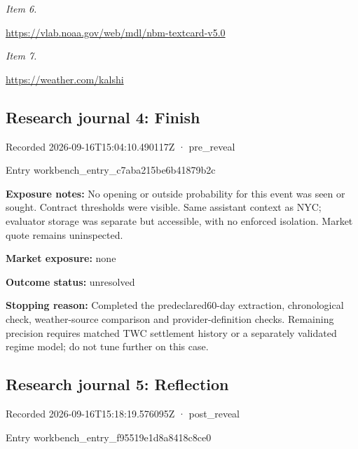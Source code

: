 \documentclass[11pt]{article}
\begin{document}
\par\noindent\textit{Item 6.}\par \href{https://vlab.noaa.gov/web/mdl/nbm-textcard-v5.0}{https://vlab\hspace{0pt}.noaa.gov/we\hspace{0pt}b/mdl/nbm-te\hspace{0pt}xtcard-v5.0}

\par\noindent\textit{Item 7.}\par \href{https://weather.com/kalshi}{https://weather.com/kalshi}

\subsection*{\textcolor{epdarkgreen}{Research journal 4: Finish}}
Recorded 2026-09-16T15:04:10.490117Z · pre\_reveal


Entry workbench\_en\hspace{0pt}try\_c7aba215\hspace{0pt}be6b41879b2c


\par\noindent\textbf{Exposure notes:} No opening or outside probability for this event was seen or sought. Contract thresholds were visible. Same assistant context as NYC; evaluator storage was separate but accessible, with no enforced isolation. Market quote remains uninspected.

\par\noindent\textbf{Market exposure:} none

\par\noindent\textbf{Outcome status:} unresolved

\par\noindent\textbf{Stopping reason:} Completed the predeclared60-day extraction, chronological check, weather-source comparison and provider-definition checks. Remaining precision requires matched TWC settlement history or a separately validated regime model; do not tune further on this case.

\subsection*{\textcolor{epdarkgreen}{Research journal 5: Reflection}}
Recorded 2026-09-16T15:18:19.576095Z · post\_reveal


Entry workbench\_en\hspace{0pt}try\_f95519e1\hspace{0pt}d8a8418c8ce0
\end{document}
